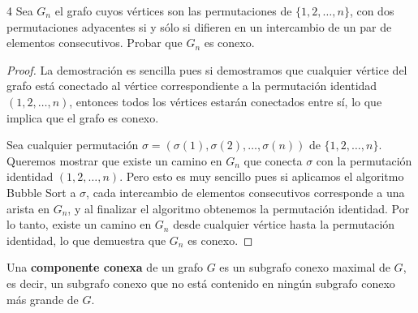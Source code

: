 \begin{ejercicio}{4}
    Sea \( G_n \) el grafo cuyos vértices son las permutaciones de \( \{1, 2, \ldots, n\} \), con dos permutaciones adyacentes si y sólo si difieren en un intercambio de un par de elementos consecutivos. Probar que \( G_n \) es conexo.
\end{ejercicio}
\begin{proof}
    La demostración es sencilla pues si demostramos que cualquier vértice del grafo está conectado al vértice correspondiente a la permutación identidad \( (1, 2, \ldots, n) \), entonces todos los vértices estarán conectados entre sí, lo que implica que el grafo es conexo.

    Sea cualquier permutación \( \sigma = (\sigma(1), \sigma(2), \ldots, \sigma(n)) \) de \( \{1, 2, \ldots, n\} \). Queremos mostrar que existe un camino en \( G_n \) que conecta \( \sigma \) con la permutación identidad \( (1, 2, \ldots, n) \).  Pero esto es muy sencillo pues si aplicamos el algoritmo Bubble Sort a \( \sigma \), cada intercambio de elementos consecutivos corresponde a una arista en \( G_n \), y al finalizar el algoritmo obtenemos la permutación identidad. Por lo tanto, existe un camino en \( G_n \) desde cualquier vértice hasta la permutación identidad, lo que demuestra que \( G_n \) es conexo.
\end{proof}

\vspace{0.5cm}

\begin{definition}
    Una \textbf{componente conexa} de un grafo \( G \) es un subgrafo conexo maximal de \( G \), es decir, un subgrafo conexo que no está contenido en ningún subgrafo conexo más grande de \( G \).
\end{definition}

